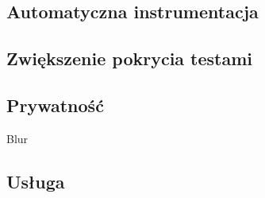 \subsection{Automatyczna instrumentacja}
\label{sec:auto_instrumentation}


\subsection{Zwiększenie pokrycia testami}
\label{sec:future_coverage}

\subsection{Prywatność}
Blur

\subsection{Usługa}
